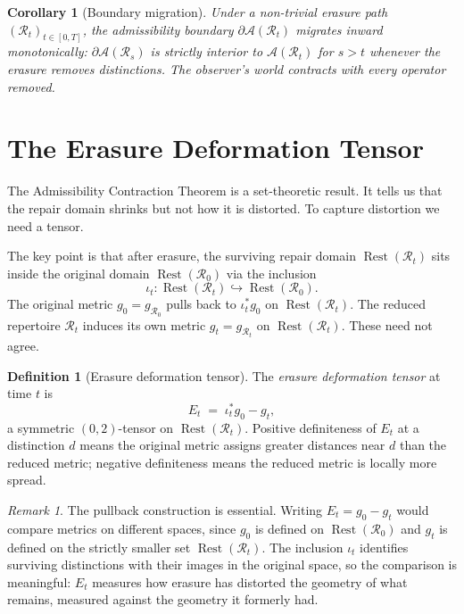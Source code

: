 \documentclass[12pt, oneside]{article}
\theoremstyle{plain}
\newtheorem{corollary}[theorem]{Corollary}
\theoremstyle{definition}
\newtheorem{definition}[theorem]{Definition}
\theoremstyle{remark}
\newtheorem{remark}[theorem]{Remark}
\DeclareMathOperator{\Rest}{Rest}
\newcommand{\AO}{\mathcal{A}}
\newcommand{\Rt}{\mathcal{R}_t}
\newcommand{\Rzero}{\mathcal{R}_0}
\newcommand{\Restzt}{\Rest(\Rt)}
\newcommand{\Restzero}{\Rest(\Rzero)}
\newcommand{\iotat}{\iota_t}
\newcommand{\Et}{E_t}
\newcommand{\gt}{g_t}
\newcommand{\gzero}{g_0}
\begin{document}
\begin{corollary}[Boundary migration]
  Under a non-trivial erasure path $(\Rt)_{t \in [0,T]}$,
  the admissibility boundary $\partial\AO(\Rt)$ migrates inward
  monotonically: $\partial\AO(\mathcal{R}_s)$ is strictly interior
  to $\AO(\mathcal{R}_t)$ for $s > t$ whenever the erasure removes
  distinctions.
  The observer's world contracts with every operator removed.
\end{corollary}


\section{The Erasure Deformation Tensor}
\label{sec:deformation}

The Admissibility Contraction Theorem is a set-theoretic result.
It tells us that the repair domain shrinks but not how it is
distorted.
To capture distortion we need a tensor.

The key point is that after erasure, the surviving repair domain
$\Restzt$ sits inside the original domain $\Restzero$ via the
inclusion
\[
  \iotat : \Restzt \hookrightarrow \Restzero.
\]
The original metric $\gzero = g_{\Rzero}$ pulls back to
$\iotat^* \gzero$ on $\Restzt$.
The reduced repertoire $\Rt$ induces its own metric $\gt =
g_{\Rt}$ on $\Restzt$.
These need not agree.

\begin{definition}[Erasure deformation tensor]
  The \emph{erasure deformation tensor} at time $t$ is
  \[
    \Et
    \;=\;
    \iotat^* \gzero - \gt,
  \]
  a symmetric $(0,2)$-tensor on $\Restzt$.
  Positive definiteness of $\Et$ at a distinction $d$ means the
  original metric assigns greater distances near $d$ than the
  reduced metric; negative definiteness means the reduced metric is
  locally more spread.
\end{definition}

\begin{remark}
  The pullback construction is essential.
  Writing $\Et = \gzero - \gt$ would compare metrics on different
  spaces, since $\gzero$ is defined on $\Restzero$ and $\gt$ is
  defined on the strictly smaller set $\Restzt$.
  The inclusion $\iotat$ identifies surviving distinctions with
  their images in the original space, so the comparison is
  meaningful: $\Et$ measures how erasure has distorted the geometry
  of what remains, measured against the geometry it formerly had.
\end{remark}
\end{document}
